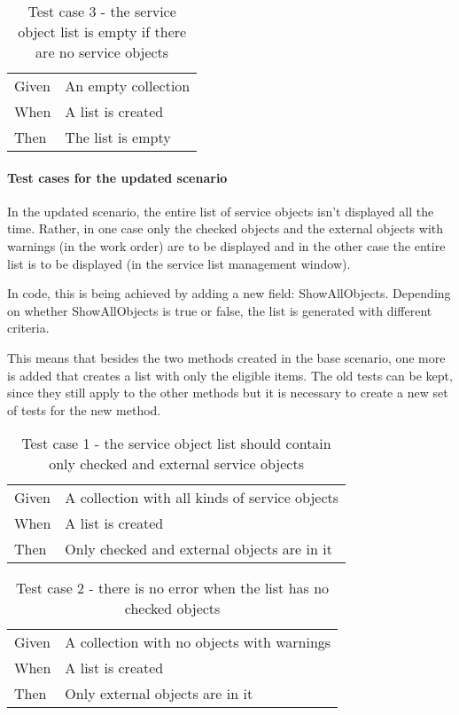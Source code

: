 \documentclass{article}
\begin{document}
				\begin{table}[h!]
					\centering
					\begin{tabular}{|p{1cm} p{7cm} |}
					\hline
					Given 	& An empty collection \\ 
					When 	& A list is created  \\	
					Then 	& The list is empty \\
					\hline
					\end{tabular}
					\caption{Test case 3 - the service object list is empty if there are no service objects}
				\end{table}

				\paragraph{Test cases for the updated scenario}
				In the updated scenario, the entire list of service objects isn't displayed all the time. Rather, in one case only the checked objects and the external objects with warnings (in the work order) are to be displayed and in the other case the entire list is to be displayed (in the service list management window).

				In code, this is being achieved by adding a new field: ShowAllObjects. Depending on whether ShowAllObjects is true or false, the list is generated with different criteria.
				
				This means that besides the two methods created in the base scenario, one more is added that creates a list with only the eligible items. The old tests can be kept, since they still apply to the other methods but it is necessary to create a new set of tests for the new method.

					\begin{table}[h!]
					\centering
					\begin{tabular}{|p{1cm} p{7cm} |}
					\hline
					Given 	& A collection with all kinds of service objects \\ 
					When 	& A list is created  \\	
					Then 	& Only checked and external objects are in it \\
					\hline
					\end{tabular}
					\caption{Test case 1 - the service object list should contain only checked and external service objects}
				\end{table}


				\begin{table}[h!]
					\centering
					\begin{tabular}{|p{1cm} p{7cm} |}
					\hline
					Given 	& A collection with no objects with warnings\\ 
					When 	& A list is created  \\	
					Then 	& Only external objects are in it \\
					\hline
					\end{tabular}
					\caption{Test case 2 - there is no error when the list has no checked objects}
				\end{table}
\end{document}

